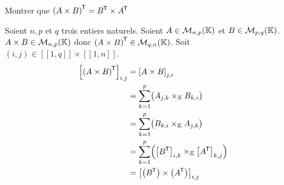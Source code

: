 \documentclass{article}
\renewenvironment{question_kholle}[2][ ]
{
	\subsection{\texorpdfstring{#2}{}}
	\notblank{#1}
	{
		\noindent #1
		\bigbreak
	}
	{}
	\begin{proof}
}
{
	\end{proof}
}
\begin{document}
	{Montrer que $\left(A \times B\right)^{\mkern-1.5mu\mathsf{T}} = B^{\mkern-1.5mu\mathsf{T}} \times A^{\mkern-1.5mu\mathsf{T}}$}

	Soient $n,p$ et $q$ trois entiers naturels.
	Soient $A \in \mathcal{M}_{n,p}(\mathbb K)$ et $B\in \mathcal{M}_{p,q}(\mathbb K)$. \\
	$A \times B \in \mathcal{M}_{n,p}(\mathbb K)$ donc $\left(A \times B\right)^{\mkern-1.5mu\mathsf{T}} \in \mathcal{M}_{q,n}(\mathbb K)$.
	Soit $(i, j) \in [\![1,q]\!] \!\times\! [\![1,n]\!]$.
	\begin{equation*}
		\begin{aligned}
			\left[ \left(A \times B\right)^{\mkern-1.5mu\mathsf{T}} \right]_{i,j}
			 & = \left[A \times B\right]_{j,i}                                                               \\
			 & = \sum_{k=1}^{p}\bigl(A_{j,k} \times_{\mathbb K} B_{k,i}\bigr)                                         \\
			 & = \sum_{k=1}^{p}\bigl(B_{k,i} \times_{\mathbb K} A_{j,k}\bigr)                                         \\
			 & = \sum_{k=1}^{p}\Bigl(\left[B^{\mkern-1.5mu\mathsf{T}}\right]_{i,k} \times_{\mathbb K} \left[A^{\mkern-1.5mu\mathsf{T}}\right]_{k,j}\Bigr) \\
			 & = \left[ \left(B^{\mkern-1.5mu\mathsf{T}}\right) \times \left(A^{\mkern-1.5mu\mathsf{T}}\right) \right]_{i,j}
		\end{aligned}
	\end{equation*}
\end{question_kholle}
\end{document}
